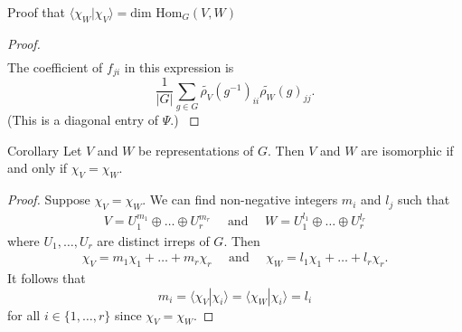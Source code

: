 \begin{frame}{Proof that $\langle \chi_W | \chi_V \rangle = \text{dim Hom}_G (V,W)$}
\begin{proof}
{\begin{align*}
\end{align*}
The coefficient of $f_{ji}$ in this expression is
\[ \frac{1}{|G|} \sum_{g \in G}\widetilde{\rho_V} (g^{-1})_{ii} \widetilde{\rho_W}(g)_{jj}. \]
(This is a diagonal entry of $\Psi$.)
}
\end{proof}
\end{frame}

\begin{frame}[plain]
\begin{block}{Corollary}
Let $V$ and $W$ be representations of $G$.  Then $V$ and $W$ are isomorphic if and only if $\chi_V = \chi_W$.
\end{block}
\begin{proof}
Suppose $\chi_V = \chi_W$. We can find non-negative integers $m_i$ and $l_j$ such that
\begin{align*}
V = U_1^{m_1} \oplus \ldots \oplus U_r^{m_r} \quad \text{ and } \quad W = U_1^{l_1} \oplus \ldots \oplus U_r^{l_r}
\end{align*}
where $U_1, \ldots, U_r$ are distinct irreps of $G$.  Then
\begin{align*}
\chi_V = m_1 \chi_1 + \ldots + m_r \chi_r \quad \text{ and } \quad  \chi_W = l_1 \chi_1 + \ldots + l_r \chi_r .
\end{align*}
It follows that
\[ m_i = \langle \chi_V | \chi_i \rangle   = \langle \chi_W | \chi_i \rangle =  l_i \]
for all $i \in \{1, \ldots, r \}$ since $\chi_V = \chi_W$.
\end{proof}
\end{frame}

